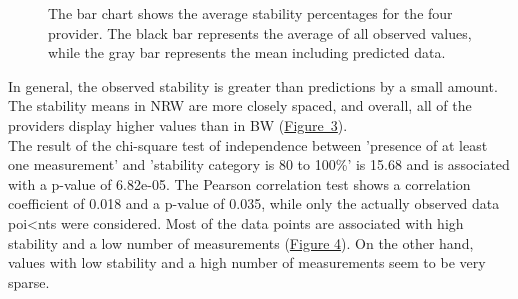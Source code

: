 \documentclass{article}
\theoremstyle{plain}
\theoremstyle{definition}
\theoremstyle{remark}
\begin{document}
 \begin{figure}[H]
 \begin{center}
\centerline{}
\caption{The bar chart shows the average stability percentages for the four provider. The black bar represents the average of all observed values, while the gray bar represents the mean including predicted data.}
 \label{fig:barchart}
 \end{center}
 \end{figure}
In general, the observed stability is greater than predictions by a small amount. The stability means in NRW are more closely spaced, and overall, all of the providers display higher values than in BW (\hyperref[fig:barchart]{Figure~3}).
\\
The result of the chi-square test of independence between 'presence of at least one measurement' and 'stability category is 80 to 100\%' is 15.68 and is associated with a p-value of 6.82e-05. The Pearson correlation test shows a correlation coefficient of 0.018 and a p-value of 0.035, while only the actually observed data poi<nts were considered.
Most of the data points are associated with high stability and a low number of measurements (\hyperref[fig:Pearson]{Figure 4}). On the other hand, values with low stability and a high number of measurements seem to be very sparse.
\end{document}
